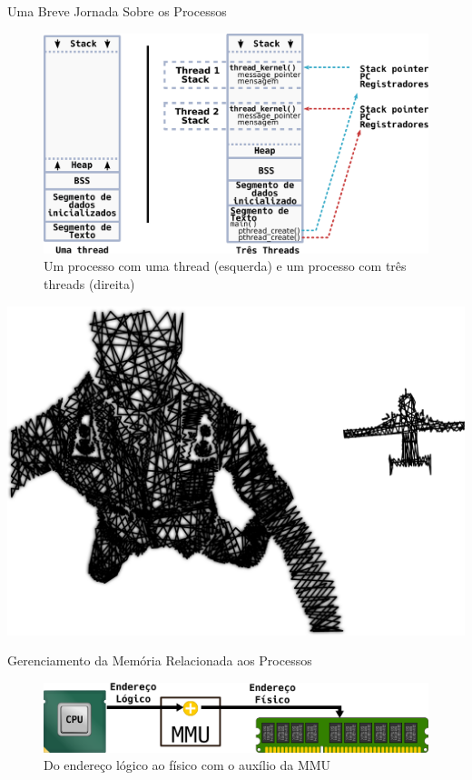 \documentclass[xcolor={usenames,svgnames,dvipsnames},brazil,english,12pt,aspectratio=149]{beamer}
\begin{document}
\begin{frame}{Uma Breve Jornada Sobre os Processos}
	\begin{figure}[!h]
		\centering
		\includegraphics[width=.80\textwidth]{theads_and_stack} 
		\caption[Um processo com uma thread e um processo com três threads]{Um processo com uma thread (esquerda) e um processo com três threads (direita)\label{fig:stack_threads}}
	\end{figure}
\end{frame}

\begin{frame}[plain]
  \includegraphics[width=\textwidth]{presentation_sec_two}
\end{frame}

\begin{frame}{Gerenciamento da Memória Relacionada aos Processos}
	\begin{figure}[!h]
		\centering
		\includegraphics[width=\textwidth]{mmu} 
		\caption{Do endereço lógico ao físico com o auxílio da MMU}
		\label{fig:mmu}
	\end{figure}
\end{frame}
\end{document}

